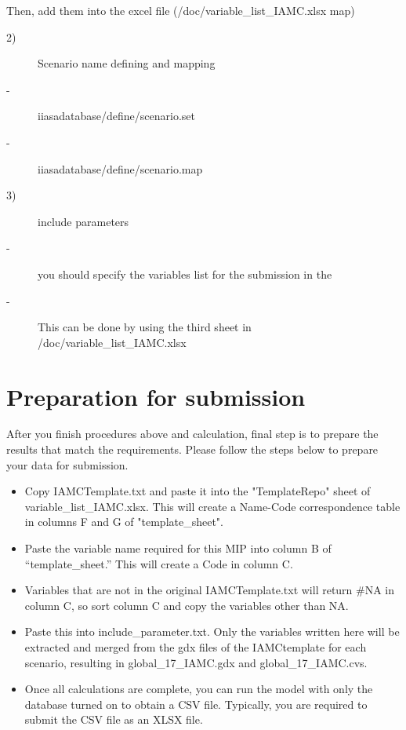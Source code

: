 \documentclass[10pt,a4paper,titlepage,dvipdfmx]{book}
\begin{document}
Then, add them into the excel file (/doc/variable\_list\_IAMC.xlsx map)
\begin{description}
\item[2)]Scenario name defining and mapping
\item[-]iiasadatabase/define/scenario.set
\item[-]iiasadatabase/define/scenario.map
\end{description}

\begin{description}
\item[3)]include parameters
\item[-]you should specify the variables list for the submission in the 
\item[-]This can be done by using the third sheet in /doc/variable\_list\_IAMC.xlsx
\end{description}

\section{\label{sec:PrepSubmission}Preparation for submission}
After you finish procedures above and calculation, final step is to prepare the results that match the requirements.
Please follow the steps below to prepare your data for submission.
\begin{itemize}
\item Copy IAMCTemplate.txt and paste it into the "TemplateRepo" sheet of variable\_list\_IAMC.xlsx. This will create a Name-Code correspondence table in columns F and G of "template\_sheet".
\item Paste the variable name required for this MIP into column B of “template\_sheet.” This will create a Code in column C. 
\item Variables that are not in the original IAMCTemplate.txt will return \#N\/A in column C, so sort column C and copy the variables other than N\/A.
\item Paste this into include\_parameter.txt. Only the variables written here will be extracted and merged from the gdx files of the IAMCtemplate for each scenario, resulting in global\_17\_IAMC.gdx and global\_17\_IAMC.cvs.
\item Once all calculations are complete, you can run the model with only the database turned on to obtain a CSV file. Typically, you are required to submit the CSV file as an XLSX file.
\end{itemize}
\end{document}
